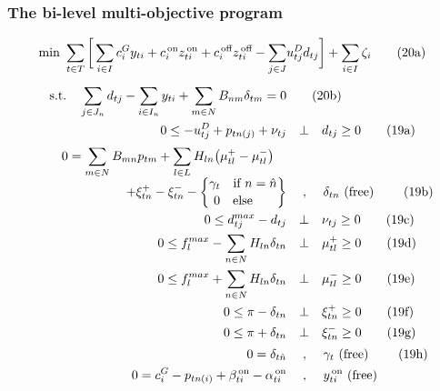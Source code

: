 \documentclass[9pt,a4paper]{article}
\newcommand{\st}{\text{s.t.} \quad}
\newcommand{\free}{\text{ (free) } }
\newcommand{\botcomma}{\; , \,}
\newcommand{\on}{^{\,\text{on}}}
\newcommand{\off}{^{\,\text{off}}}
\begin{document}
\subsubsection*{The bi-level multi-objective program}
\begin{subequations} 
\begin{align}
\min \ \sum_{t \in T} \bigg[
\sum_{i \in I} c^G_{i} y_{ti} + c\on_{i} z\on_{ti} + c\off_{i} z\off_{ti}
- \sum_{j \in J} & u^D_{tj} d_{tj}
\bigg]
+ \sum_{i \in I} \zeta_i 
	\tag{20a} \label{example:MO:optimization} \\[5 pt]
\st \sum_{j \in J_n} d_{tj} - \sum_{i \in I_n} y_{ti} + \sum_{m \in N} B_{nm} \delta_{tm} = 0 &
\tag{20b} \label{example:MO:MBC} \\ 
0 \leq - u^D_{tj} + p_{tn(j)} + \nu_{tj} &\quad \bot \quad d_{tj} \geq 0 
	\tag{19a} \label{example:ISO:KKT:demand} \\[2 pt]
0 = \sum_{m\in N} B_{mn} p_{tm} 
+ \sum_{l \in L} H_{ln} \big( \mu^+_{tl} - \mu^-_{tl}\big) \quad & \nonumber \\[- 4 pt]
+ \xi^+_{tn} - \xi^-_{tn} - 
\genfrac\{\}{0pt}{0}{\gamma_t \quad \text{if }n = \hat{n}}{0 \quad \text{else} \hspace{0.55 cm}}
& \quad \botcomma \quad \delta_{tn} \free \tag{19b} \label{example:ISO:KKT:delta} \\
0 \leq d^{max}_{tj} - d_{tj} &\quad \bot \quad \nu_{tj} \geq 0 
	\tag{19c} \label{example:ISO:KKT:demand:max} \\
0 \leq f^{max}_l - \sum_{n \in N} H_{ln} \delta_{tn} &\quad \bot \quad \mu^+_{tl} \geq 0 
	\tag{19d} \label{example:ISO:KKT:flow:pos} \\
0 \leq f^{max}_l + \sum_{n \in N} H_{ln} \delta_{tn} &\quad \bot \quad  \mu^-_{tl} \geq 0
	\tag{19e}  \label{example:ISO:KKT:flow:neg} \\
0 \leq \pi - \delta_{tn} &\quad \bot \quad \xi^+_{tn} \geq 0
	\tag{19f}  \label{example:ISO:KKT:angle:pos} \\
0 \leq \pi + \delta_{tn} &\quad \bot \quad \xi^-_{tn} \geq 0 
	\tag{19g} \label{example:ISO:KKT:angle:neg} \\[2 pt]
0 = \delta_{t\hat{n}}  &\quad \botcomma \quad \gamma_t \free 
	\tag{19h} \label{example:ISO:KKT:slackbus} \\
0 = c^G_{i} - p_{tn(i)} + \beta\on_{ti} - \alpha\on_{ti} &\quad \botcomma \quad y\on_{ti} \free 

\end{align}
\end{subequations}
\end{document}
